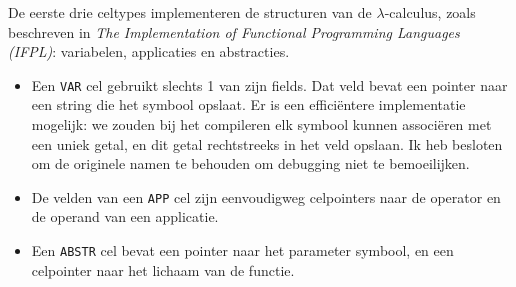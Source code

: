 \documentclass[a4paper,10pt]{article}
\begin{document}
De eerste drie celtypes implementeren de structuren van de $\lambda$-calculus, zoals beschreven in \emph{The Implementation of Functional Programming Languages (IFPL)}: variabelen, applicaties en abstracties.
\begin{itemize}
\item
  Een \texttt{VAR} cel gebruikt slechts 1 van zijn fields.
  Dat veld bevat een pointer naar een string die het symbool opslaat.
  Er is een effici{\"e}ntere implementatie mogelijk: we zouden bij het compileren elk symbool kunnen associ{\"e}ren met een uniek getal, en dit getal rechtstreeks in het veld opslaan.
  Ik heb besloten om de originele namen te behouden om debugging niet te bemoeilijken.
\item
  De velden van een \texttt{APP} cel zijn eenvoudigweg celpointers naar de operator en de operand van een applicatie.
\item
  Een \texttt{ABSTR} cel bevat een pointer naar het parameter symbool, en een celpointer naar het lichaam van de functie.
\end{itemize}
\end{document}
